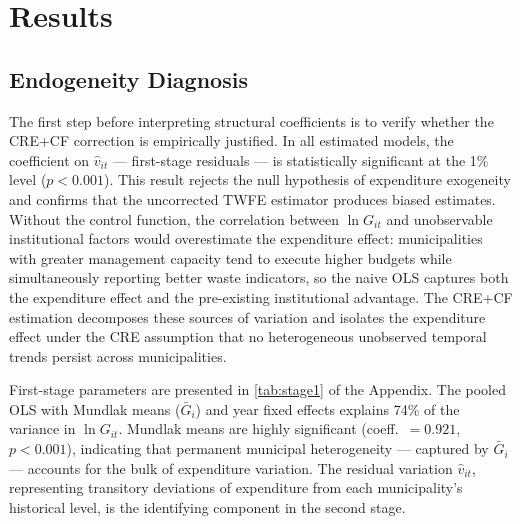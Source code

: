 
\section{Results}
\label{sec:resultados}

\subsection{Endogeneity Diagnosis}
\label{sec:endogeneidad}

The first step before interpreting structural coefficients is to verify whether the CRE+CF correction is empirically justified. In all estimated models, the coefficient on $\hat{v}_{it}$ --- first-stage residuals --- is statistically significant at the 1\% level ($p < 0.001$). This result rejects the null hypothesis of expenditure exogeneity and confirms that the uncorrected TWFE estimator produces biased estimates. Without the control function, the correlation between $\ln G_{it}$ and unobservable institutional factors would overestimate the expenditure effect: municipalities with greater management capacity tend to execute higher budgets while simultaneously reporting better waste indicators, so the naive OLS captures both the expenditure effect and the pre-existing institutional advantage. The CRE+CF estimation decomposes these sources of variation and isolates the expenditure effect under the CRE assumption that no heterogeneous unobserved temporal trends persist across municipalities.

First-stage parameters are presented in \cref{tab:stage1} of the Appendix. The pooled OLS with Mundlak means ($\bar{G}_{i}$) and year fixed effects explains 74\% of the variance in $\ln G_{it}$. Mundlak means are highly significant (coeff.\ $= 0.921$, $p < 0.001$), indicating that permanent municipal heterogeneity --- captured by $\bar{G}_{i}$ --- accounts for the bulk of expenditure variation. The residual variation $\hat{v}_{it}$, representing transitory deviations of expenditure from each municipality's historical level, is the identifying component in the second stage.

